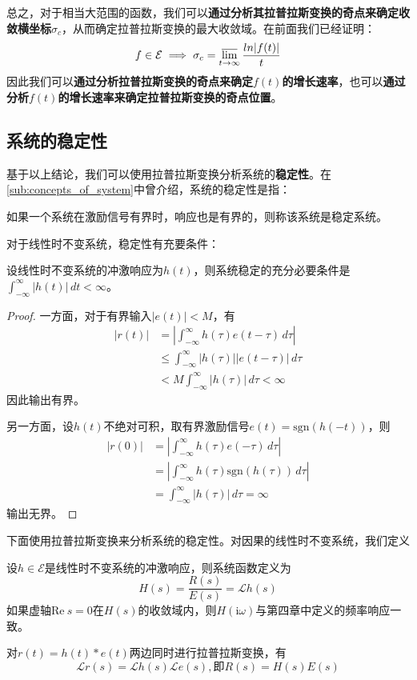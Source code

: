 \documentclass{ctexbook}
\begin{document}
总之，对于相当大范围的函数，我们可以\textbf{通过分析其拉普拉斯变换的奇点来确定收敛横坐标}$\sigma_c$，从而确定拉普拉斯变换的最大收敛域。在前面我们已经证明：$$f\in\mathcal{E}\implies \sigma_c=\varlimsup_{t\to\infty}\frac{ln|f(t)|}{t}$$
因此我们可以\textbf{通过分析拉普拉斯变换的奇点来确定$f(t)$的增长速率}，也可以\textbf{通过分析$f(t)$的增长速率来确定拉普拉斯变换的奇点位置}。

\subsection{系统的稳定性}\label{sub:stability_of_system}
基于以上结论，我们可以使用拉普拉斯变换分析系统的\textbf{稳定性}。在\ref{sub:concepts_of_system}中曾介绍，系统的稳定性是指：
\begin{definition}
    如果一个系统在激励信号有界时，响应也是有界的，则称该系统是稳定系统。
\end{definition}

对于线性时不变系统，稳定性有充要条件：
\begin{proposition}[稳定性的时域判则]
    设线性时不变系统的冲激响应为$h(t)$，则系统稳定的充分必要条件是$\int_{-\infty}^{\infty}|h(t)|\,dt<\infty$。
\end{proposition}
\begin{proof}
    一方面，对于有界输入$|e(t)|<M$，有
    \begin{align*}
        |r(t)|&=\left|\int_{-\infty}^{\infty}h(\tau)e(t-\tau)\,d\tau\right|\\
        &\leq \int_{-\infty}^{\infty}|h(\tau)||e(t-\tau)|\,d\tau\\
        &<M\int_{-\infty}^{\infty}|h(\tau)|\,d\tau<\infty
    \end{align*}
    因此输出有界。

    另一方面，设$h(t)$不绝对可积，取有界激励信号$e(t)=\text{sgn}(h(-t))$，则
    \begin{align*}
        |r(0)|&=\left|\int_{-\infty}^{\infty}h(\tau)e(-\tau)\,d\tau\right|\\
        &=\left|\int_{-\infty}^{\infty}h(\tau)\text{sgn}(h(\tau))\,d\tau\right|\\
        &=\int_{-\infty}^{\infty}|h(\tau)|\,d\tau=\infty
    \end{align*}
    输出无界。
\end{proof}

下面使用拉普拉斯变换来分析系统的稳定性。对因果的线性时不变系统，我们定义
\begin{definition}[系统函数]
    设$h\in\mathcal{E} $是线性时不变系统的冲激响应，则系统函数定义为
    $$H(s)=\frac{R(s)}{E(s)}=\mathcal{L} h(s)$$
    如果虚轴$\text{Re}\ s=0$在$H(s)$的收敛域内，则$H(\mathrm{i}\omega)$与第四章中定义的频率响应一致。
\end{definition}
对$r(t)=h(t)*e(t)$两边同时进行拉普拉斯变换，有
\[\mathcal{L} r(s)=\mathcal{L} h(s)\mathcal{L} e(s),\text{即}R(s)=H(s)E(s)\]
\end{document}
